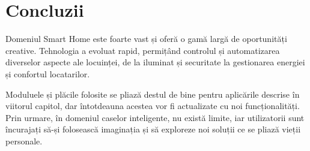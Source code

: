 \section{Concluzii}

Domeniul Smart Home este foarte vast și oferă o gamă largă de oportunități creative. Tehnologia a evoluat rapid, permițând controlul și automatizarea diverselor aspecte ale locuinței, de la iluminat și securitate la gestionarea energiei și confortul locatarilor. 

Moduluele și plăcile folosite se pliază destul de bine pentru aplicările descrise în viitorul capitol, dar întotdeauna acestea vor fi actualizate cu noi funcționalități. Prin urmare, în domeniul caselor inteligente, nu există limite, iar utilizatorii sunt încurajați să-și folosească imaginația și să exploreze noi soluții ce se pliază vieții personale.